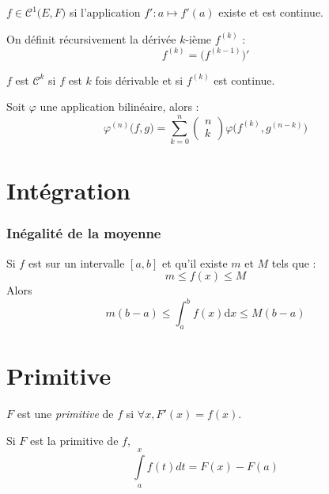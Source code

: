 \documentclass[11pt,a4paper,fleqn,pdftex]{report}
\begin{document}
\begin{dfn}
$f \in \mathcal{C}^1\big( E,F \big)$ si l'application $f' : a \mapsto f'(a)$ existe et est continue.
\end{dfn}


\begin{dfn}
On définit récursivement la dérivée $k$-ième $f^{(k)}$ : 
\begin{equation}
    f^{(k)}=\big( f^{(k-1)} \big) '
\end{equation}
\end{dfn}
\begin{dfn}
$f$ est $\mathcal{C}^k$ si $f$ est $k$ fois dérivable et si $f^{(k)}$ est continue.
\end{dfn}

\begin{theorem}
Soit $\varphi$ une application bilinéaire, alors :
\begin{equation}\tag{Leibniz}\label{Leibniz}
\varphi^{(n)}\big( f,g \big) = \sum_{k=0}^n \begin{pmatrix} n \\ k \end{pmatrix} \varphi \big( f^{(k)},g^{(n-k)} \big)
\end{equation}
\end{theorem}
\section{Intégration}
\subsubsection{Inégalité de la moyenne} %
\label{ssub:inegalite_de_la_moyenne}
\begin{itheorem}
    Si $f$ est  sur un intervalle $[a,b]$ et qu'il existe $m$ et $M$ tels que : 
    \[
        m \le f(x) \le M
    \]
    Alors 
    \begin{equation}\label{eq:inegalite_de_la_moyenne}
    m(b-a) \le \int_a^b f(x) \mathrm{d}x \le M(b-a)
    \end{equation}
\end{itheorem}
    
\section{Primitive}
\begin{dfn}[Primitive]
$F$ est une \emph{primitive} de $f$ si $\forall x, F'(x)=f(x)$. 
\end{dfn}
\begin{theorem}
Si $F$ est la primitive de $f$,
\begin{equation}
    \int \limits_a^x f(t) dt = F(x) - F(a)
\end{equation}
\end{theorem}
\end{document}
